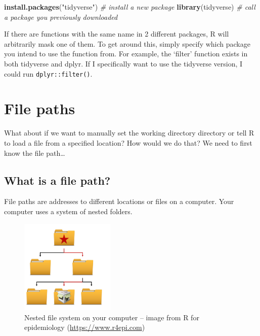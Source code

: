 \documentclass[
]{book}
\newenvironment{Shaded}{\begin{snugshade}}{\end{snugshade}}
\newcommand{\CommentTok}[1]{\textcolor[rgb]{0.56,0.35,0.01}{\textit{#1}}}
\newcommand{\FunctionTok}[1]{\textcolor[rgb]{0.13,0.29,0.53}{\textbf{#1}}}
\newcommand{\NormalTok}[1]{#1}
\newcommand{\StringTok}[1]{\textcolor[rgb]{0.31,0.60,0.02}{#1}}
\begin{document}
\begin{Shaded}
\begin{Highlighting}[]
\FunctionTok{install.packages}\NormalTok{(}\StringTok{"tidyverse"}\NormalTok{) }\CommentTok{\# install a new package}
\FunctionTok{library}\NormalTok{(tidyverse) }\CommentTok{\# call a package you previously downloaded}
\end{Highlighting}
\end{Shaded}

If there are functions with the same name in 2 different packages, R will
arbitrarily mask one of them. To get around this, simply specify which package
you intend to use the function from. For example, the `filter' function exists in both tidyverse and dplyr. If I specifically want to use the tidyverse version, I could run \texttt{dplyr::filter()}.

\chapter{File paths}\label{FilePaths}

What about if we want to manually set the working directory directory or tell R to load a file from a specified location? How would we do that? We need to first know the file path\ldots{}

\section{What is a file path?}\label{what-is-a-file-path}

File paths are addresses to different locations or files on a computer. Your computer uses a system of nested folders.

\begin{figure}
\centering
\includegraphics[width=0.4\textwidth,height=\textheight]{./docs/files/file_path_hierarchy.png}
\caption{Nested file system on your computer -- image from R for epidemiology (\url{https://www.r4epi.com})}
\end{figure}
\end{document}
